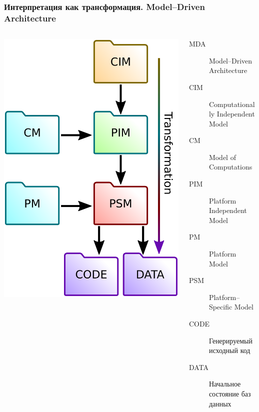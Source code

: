 \documentclass[10pt]{beamer}
\begin{document}
\begin{frame}[fragile]
  \frametitle{Интерпретация как трансформация. Model--Driven Architecture}
  \begin{columns}
    \begin{column}{0.4\textwidth}
      \includegraphics[width=1\linewidth]{mda-most-general.pdf}
    \end{column}
    \begin{column}{0.7\linewidth}
      \begin{description}
      \item[MDA] Model--Driven Architecture
      \item[CIM] Computationally Independent Model
      \item[CM] Model of Computations
      \item[PIM] Platform Independent Model
      \item[PM] Platform Model
      \item[PSM] Platform--Specific Model
      \item[CODE] Генерируемый исходный код
      \item[DATA] Начальное состояние баз данных
      \end{description}
    \end{column}
  \end{columns}
\end{frame}
\end{document}

